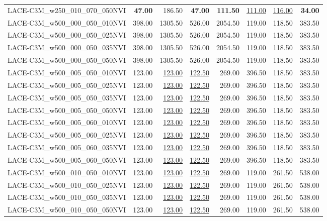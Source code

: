 \begin{table}
\begin{tabular}{lrrrrrrr}
LACE-C3M\_w250\_010\_070\_050NVI & \textbf{47.00} & 186.50 & \textbf{47.00} & \textbf{111.50} & \underline{111.00} & \underline{116.00} & \textbf{34.00} \\
LACE-C3M\_w500\_000\_050\_010NVI & 398.00 & 1305.50 & 526.00 & 2054.50 & 119.00 & 118.50 & 383.50 \\
LACE-C3M\_w500\_000\_050\_025NVI & 398.00 & 1305.50 & 526.00 & 2054.50 & 119.00 & 118.50 & 383.50 \\
LACE-C3M\_w500\_000\_050\_035NVI & 398.00 & 1305.50 & 526.00 & 2054.50 & 119.00 & 118.50 & 383.50 \\
LACE-C3M\_w500\_000\_050\_050NVI & 398.00 & 1305.50 & 526.00 & 2054.50 & 119.00 & 118.50 & 383.50 \\
LACE-C3M\_w500\_005\_050\_010NVI & 123.00 & \underline{123.00} & \underline{122.50} & 269.00 & 396.50 & 118.50 & 383.50 \\
LACE-C3M\_w500\_005\_050\_025NVI & 123.00 & \underline{123.00} & \underline{122.50} & 269.00 & 396.50 & 118.50 & 383.50 \\
LACE-C3M\_w500\_005\_050\_035NVI & 123.00 & \underline{123.00} & \underline{122.50} & 269.00 & 396.50 & 118.50 & 383.50 \\
LACE-C3M\_w500\_005\_050\_050NVI & 123.00 & \underline{123.00} & \underline{122.50} & 269.00 & 396.50 & 118.50 & 383.50 \\
LACE-C3M\_w500\_005\_060\_010NVI & 123.00 & \underline{123.00} & \underline{122.50} & 269.00 & 396.50 & 118.50 & 383.50 \\
LACE-C3M\_w500\_005\_060\_025NVI & 123.00 & \underline{123.00} & \underline{122.50} & 269.00 & 396.50 & 118.50 & 383.50 \\
LACE-C3M\_w500\_005\_060\_035NVI & 123.00 & \underline{123.00} & \underline{122.50} & 269.00 & 396.50 & 118.50 & 383.50 \\
LACE-C3M\_w500\_005\_060\_050NVI & 123.00 & \underline{123.00} & \underline{122.50} & 269.00 & 396.50 & 118.50 & 383.50 \\
LACE-C3M\_w500\_010\_050\_010NVI & 123.00 & \underline{123.00} & \underline{122.50} & 269.00 & 119.00 & 261.50 & 538.00 \\
LACE-C3M\_w500\_010\_050\_025NVI & 123.00 & \underline{123.00} & \underline{122.50} & 269.00 & 119.00 & 261.50 & 538.00 \\
LACE-C3M\_w500\_010\_050\_035NVI & 123.00 & \underline{123.00} & \underline{122.50} & 269.00 & 119.00 & 261.50 & 538.00 \\
LACE-C3M\_w500\_010\_050\_050NVI & 123.00 & \underline{123.00} & \underline{122.50} & 269.00 & 119.00 & 261.50 & 538.00 \\

\end{tabular}
\end{table}
